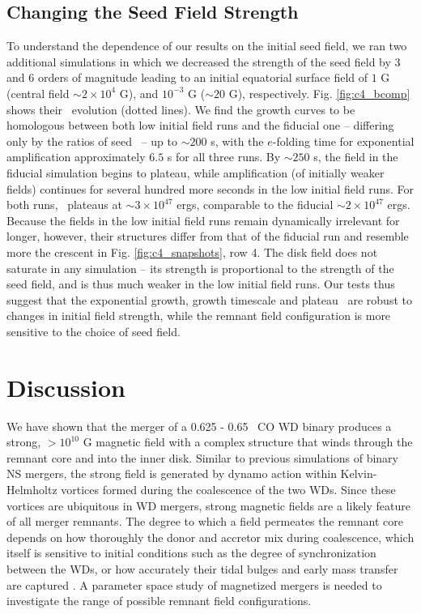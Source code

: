 \subsection{Changing the Seed Field Strength}
\label{ssec:c4_seed}

To understand the dependence of our results on the initial seed field, we ran two additional simulations in which we decreased the strength of the seed field by $3$ and $6$ orders of magnitude leading to an initial equatorial surface field of $1$ G (central field $\sim2\times10^{4}$ G), and $10^{-3}$ G ($\sim20$ G), respectively.  Fig. \ref{fig:c4_bcomp} shows their \EB\ evolution (dotted lines).  We find the growth curves to be homologous between both low initial field runs and the fiducial one -- differing only by the ratios of seed \EB\ -- up to $\sim200$ s, with the $e$-folding time for exponential amplification approximately $6.5$ s for all three runs.  By $\sim250$ s, the field in the fiducial simulation begins to plateau, while amplification (of initially weaker fields) continues for several hundred more seconds in the low initial field runs.  For both runs, \EB\ plateaus at $\sim3\times10^{47}$ ergs, comparable to the fiducial $\sim2\times10^{47}$ ergs.  Because the fields in the low initial field runs remain dynamically irrelevant for longer, however, their structures differ from that of the fiducial run and resemble more the crescent in Fig. \ref{fig:c4_snapshots}, row 4.  The disk field does not saturate in any simulation -- its strength is proportional to the strength of the seed field, and is thus much weaker in the low initial field runs.  Our tests thus suggest that the exponential growth, growth timescale and plateau \EB\ are robust to changes in initial field strength, while the remnant field configuration is more sensitive to the choice of seed field.

\section{Discussion}
\label{sec:c4_discussion}

We have shown that the merger of a 0.625 - 0.65 \Msun\ CO WD binary produces a strong, $>10^{10}$ G magnetic field with a complex structure that winds through the remnant core and into the inner disk.  Similar to previous simulations of binary NS mergers, the strong field is generated by dynamo action within Kelvin-Helmholtz vortices formed during the coalescence of the two WDs.  Since these vortices are ubiquitous in WD mergers, strong magnetic fields are a likely feature of all merger remnants.  The degree to which a field permeates the remnant core depends on how thoroughly the donor and accretor mix during coalescence, which itself is sensitive to initial conditions such as the degree of synchronization between the WDs, or how accurately their tidal bulges and early mass transfer are captured \citep{dan+11, dan+14}.  A parameter space study of magnetized mergers is needed to investigate the range of possible remnant field configurations.

